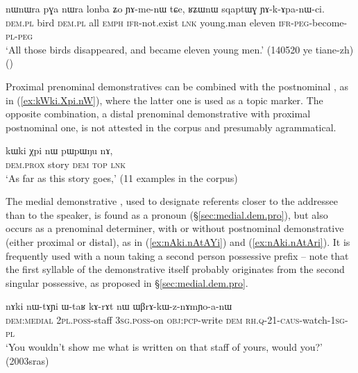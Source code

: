 \begin{exe}
\ex \label{ex:nWnWra.pGa.nWra}
 \gll nɯnɯra pɣa nɯra lonba ʑo ɲɤ-me-nɯ tɕe, ʁʑɯnɯ sqaptɯɣ ɲɤ-k-ɤpa-nɯ-ci. \\
 \textsc{dem}.\textsc{pl} bird  \textsc{dem}.\textsc{pl}  all \textsc{emph} \textsc{ifr}-not.exist \textsc{lnk} young.man eleven \textsc{ifr}-\textsc{peg}-become-\textsc{pl}-\textsc{peg} \\
 \glt `All those birds disappeared, and became eleven young men.' (140520 ye tiane-zh)
()
\end{exe}

Proximal prenominal demonstratives can be combined with the postnominal , as in (\ref{ex:kWki.Xpi.nW}), where the latter one is used as a topic marker. The opposite combination, a distal prenominal demonstrative with proximal postnominal one, is not attested in the corpus and presumably agrammatical.

\begin{exe}
\ex \label{ex:kWki.Xpi.nW}
 \gll kɯki χpi nɯ pɯpɯŋu nɤ,  \\
 \textsc{dem}.\textsc{prox} story \textsc{dem} \textsc{top} \textsc{lnk} \\
 \glt `As far as this story goes,' (11 examples in the corpus)
\end{exe}

The medial demonstrative , used to designate referents closer to the addressee than to the speaker, is found as a pronoun (§\ref{sec:medial.dem.pro}), but also occurs as a prenominal determiner, with or without postnominal demonstrative (either proximal or distal), as in (\ref{ex:nAki.nAtAYi}) and (\ref{ex:nAki.nAtAri}). It is frequently used with a noun taking a second person possessive prefix -- note that the first syllable  of the demonstrative  itself probably originates from the second singular possessive, as proposed in §\ref{sec:medial.dem.pro}.

\begin{exe}
\ex \label{ex:nAki.nAtAYi}
 \gll nɤki nɯ-tɤɲi ɯ-taʁ kɤ-rɤt nɯ ɯβrɤ-kɯ-z-nɤmɲo-a-nɯ \\
 \textsc{dem}:\textsc{medial} \textsc{2pl}.\textsc{poss}-staff \textsc{3sg}.\textsc{poss}-on \textsc{obj}:\textsc{pcp}-write \textsc{dem} \textsc{rh}.\textsc{q}-2\fl{}1-\textsc{caus}-watch-\textsc{1sg}-\textsc{pl} \\
 \glt `You wouldn't show me what is written on that staff of yours, would you?' (2003sras)
\end{exe}

